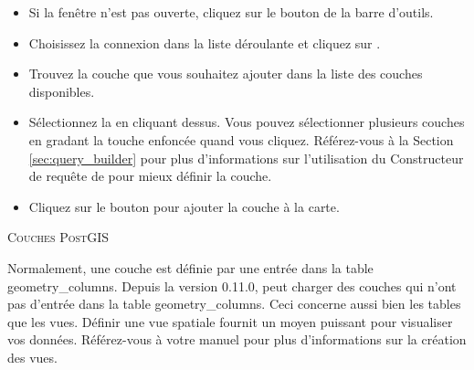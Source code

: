 \begin{itemize}[label=--]
\item Si la fenêtre  n'est pas ouverte, cliquez sur le bouton  de la barre d'outils.
\item Choisissez la connexion dans la liste déroulante et cliquez sur .
\item Trouvez la couche que vous souhaitez ajouter dans la liste des couches disponibles.
\item Sélectionnez la en cliquant dessus. Vous pouvez sélectionner plusieurs couches en gradant la touche  enfoncée quand vous cliquez. Référez-vous à la Section \ref{sec:query_builder} pour plus d'informations sur l'utilisation du Constructeur de requête de \psq pour mieux définir la couche.
\item Cliquez sur le bouton  pour ajouter la couche à la carte.
\end{itemize}

\begin{Tip}\caption{\textsc{Couches PostGIS}}
Normalement, une couche \pg est définie par une entrée dans la table geometry\_columns. Depuis la version 0.11.0, \qg peut charger des couches qui n'ont pas d'entrée dans la table geometry\_columns. Ceci concerne aussi bien les tables que les vues. Définir une vue spatiale fournit un moyen puissant pour visualiser vos données. Référez-vous à votre manuel \psq pour plus d'informations sur la création des vues.
\end{Tip}


